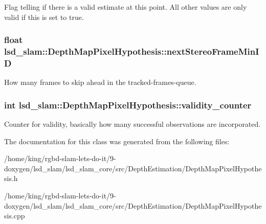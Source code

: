 Flag telling if there is a valid estimate at this point. All other values are only valid if this is set to true. \hypertarget{classlsd__slam_1_1_depth_map_pixel_hypothesis_a6de9a990e0a4cbbd2ce810503996f76c}{
\subsubsection[{next\-Stereo\-Frame\-Min\-I\-D}]{\setlength{\rightskip}{0pt plus 5cm}float lsd\-\_\-slam\-::\-Depth\-Map\-Pixel\-Hypothesis\-::next\-Stereo\-Frame\-Min\-I\-D}}\label{classlsd__slam_1_1_depth_map_pixel_hypothesis_a6de9a990e0a4cbbd2ce810503996f76c}
How many frames to skip ahead in the tracked-\/frames-\/queue. \hypertarget{classlsd__slam_1_1_depth_map_pixel_hypothesis_a56802b2f4413dd295383d142a3499808}{
\subsubsection[{validity\-\_\-counter}]{\setlength{\rightskip}{0pt plus 5cm}int lsd\-\_\-slam\-::\-Depth\-Map\-Pixel\-Hypothesis\-::validity\-\_\-counter}}\label{classlsd__slam_1_1_depth_map_pixel_hypothesis_a56802b2f4413dd295383d142a3499808}
Counter for validity, basically how many successful observations are incorporated. 

The documentation for this class was generated from the following files\-:\begin{DoxyCompactItemize}
\item 
/home/king/rgbd-\/slam-\/lets-\/do-\/it/9-\/doxygen/lsd\-\_\-slam/lsd\-\_\-slam\-\_\-core/src/\-Depth\-Estimation/Depth\-Map\-Pixel\-Hypothesis.\-h\item 
/home/king/rgbd-\/slam-\/lets-\/do-\/it/9-\/doxygen/lsd\-\_\-slam/lsd\-\_\-slam\-\_\-core/src/\-Depth\-Estimation/Depth\-Map\-Pixel\-Hypothesis.\-cpp\end{DoxyCompactItemize}
